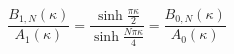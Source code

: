 \begin{equation}
\frac{B_{1,N}(\kappa)}{A_1(\kappa)}=
\frac{\sinh\frac{\pi\kappa}{2}}{\sinh\frac{N\pi\kappa}{4}}=
\frac{B_{0,N}(\kappa)}{A_0(\kappa)}
\label{B1/A1}
\end{equation}

